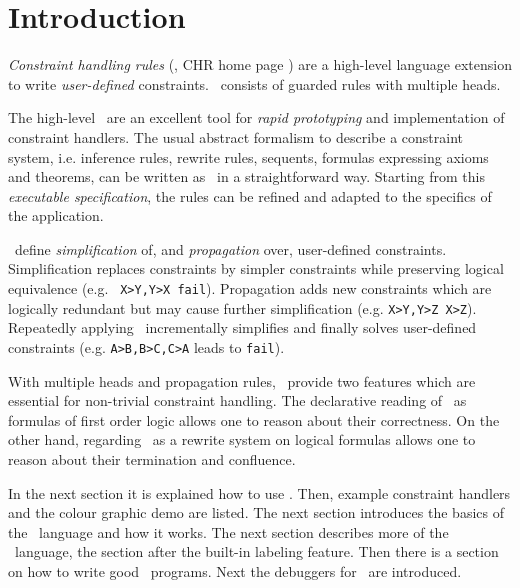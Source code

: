 \section{Introduction}

{\em Constraint handling rules} (\chrs,
CHR home page )
\cite{fru92}
are a high-level language
extension to write {\em user-defined} constraints. \chrs\ 
consists of guarded rules with multiple heads.

The high-level \chrs\ are an excellent tool for {\em rapid prototyping} and
implementation of constraint handlers. The usual abstract formalism to
describe a constraint system, i.e. inference rules, rewrite rules,
sequents, formulas expressing axioms and theorems, can be written as
\chrs\ in a straightforward way.  Starting from this {\em executable
specification}, the rules can be refined and adapted
to the specifics of the application.  

\chrs\ define {\em simplification} of, and {\em propagation} over, 
user-defined constraints.  Simplification replaces constraints by
simpler constraints while preserving logical equivalence (e.g.  {\tt
X>Y,Y>X
\rep fail}).  Propagation adds new constraints which are logically
redundant but may cause further simplification (e.g. {\tt X>Y,Y>Z \aug
X>Z}).  Repeatedly applying \chrs\ incrementally simplifies and
finally solves user-defined constraints (e.g. {\tt A>B,B>C,C>A}
leads to {\tt fail}).  

With multiple heads and propagation rules,
\chrs\ provide two features which are essential for non-trivial
constraint handling.
The declarative reading of
\chrs\ as formulas of first order logic 
allows one to reason about their correctness.  On the other hand, 
regarding \chrs\ as a rewrite system on logical formulas allows one to
reason about their termination and confluence.


In the next section
it is explained how to use \chrs.
 Then,
example constraint handlers and the colour graphic
demo are listed.
 The next
section introduces the basics of the \chr\ language and how it works.  
The next section describes more of the \chr\ language,
the section after the built-in labeling feature.
Then there is
a section on how to write good \chr\ programs.  Next the debuggers for
\chrs\ are introduced.  


